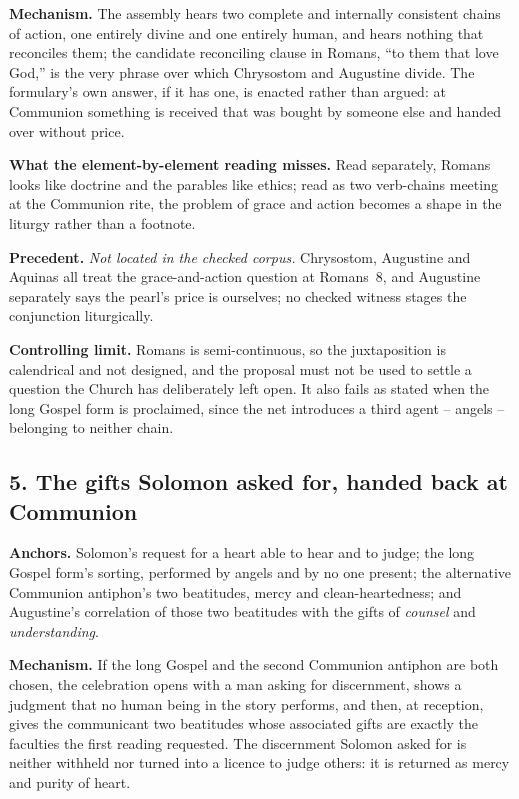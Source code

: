 \textbf{Mechanism.} The assembly hears two complete and internally consistent chains of action, one entirely divine and one entirely human, and hears nothing that reconciles them; the candidate reconciling clause in Romans, ``to them that love God,'' is the very phrase over which Chrysostom and Augustine divide. The formulary's own answer, if it has one, is enacted rather than argued: at Communion something is received that was bought by someone else and handed over without price.

\textbf{What the element-by-element reading misses.} Read separately, Romans looks like doctrine and the parables like ethics; read as two verb-chains meeting at the Communion rite, the problem of grace and action becomes a shape in the liturgy rather than a footnote.

\textbf{Precedent.} \emph{Not located in the checked corpus.} Chrysostom, Augustine and Aquinas all treat the grace-and-action question at Romans~8, and Augustine separately says the pearl's price is ourselves; no checked witness stages the conjunction liturgically.

\textbf{Controlling limit.} Romans is semi-continuous, so the juxtaposition is calendrical and not designed, and the proposal must not be used to settle a question the Church has deliberately left open. It also fails as stated when the long Gospel form is proclaimed, since the net introduces a third agent -- angels -- belonging to neither chain.

\subsection*{5. The gifts Solomon asked for, handed back at Communion}

\textbf{Anchors.} Solomon's request for a heart able to hear and to judge; the long Gospel form's sorting, performed by angels and by no one present; the alternative Communion antiphon's two beatitudes, mercy and clean-heartedness; and Augustine's correlation of those two beatitudes with the gifts of \emph{counsel} and \emph{understanding}.

\textbf{Mechanism.} If the long Gospel and the second Communion antiphon are both chosen, the celebration opens with a man asking for discernment, shows a judgment that no human being in the story performs, and then, at reception, gives the communicant two beatitudes whose associated gifts are exactly the faculties the first reading requested. The discernment Solomon asked for is neither withheld nor turned into a licence to judge others: it is returned as mercy and purity of heart.


